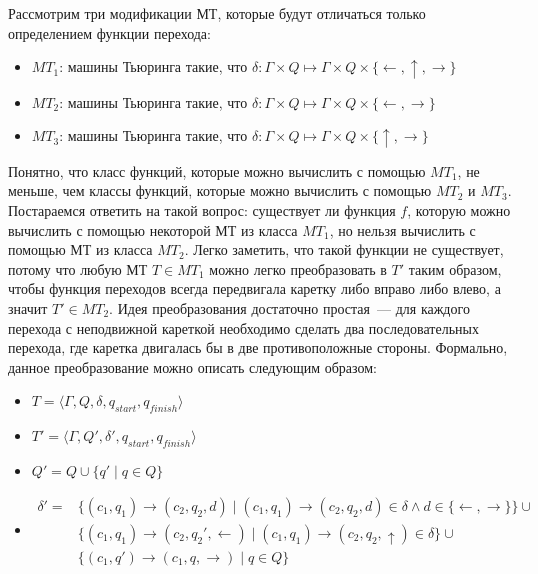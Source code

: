 \documentclass[
    11pt,
    a4paper
]{article}
\theoremstyle{definition}
\begin{document}
Рассмотрим три модификации МТ, которые будут отличаться только определением функции перехода:
\begin{itemize}
\item $MT_1$: машины Тьюринга такие, что $\delta: \Gamma \times Q \mapsto \Gamma \times Q \times \{\leftarrow, \uparrow, \rightarrow\}$
\item $MT_2$: машины Тьюринга такие, что $\delta: \Gamma \times Q \mapsto \Gamma \times Q \times \{\leftarrow, \rightarrow\}$
\item $MT_3$: машины Тьюринга такие, что $\delta: \Gamma \times Q \mapsto \Gamma \times Q \times \{\uparrow, \rightarrow\}$
\end{itemize}

Понятно, что класс функций, которые можно вычислить с помощью $MT_1$, не меньше, чем классы функций, которые можно вычислить с помощью $MT_2$ и $MT_3$. Постараемся ответить на такой вопрос: существует ли функция $f$, которую можно вычислить с помощью некоторой МТ из класса $MT_1$, но нельзя вычислить с помощью МТ из класса $MT_2$. Легко заметить, что такой функции не существует, потому что любую МТ $T \in MT_1$ можно легко преобразовать в $T'$ таким образом, чтобы функция переходов всегда передвигала каретку либо вправо либо влево, а значит $T' \in MT_2$. Идея преобразования достаточно простая~--- для каждого перехода с неподвижной кареткой необходимо сделать два последовательных перехода, где каретка двигалась бы в две противоположные стороны. Формально, данное преобразование можно описать следующим образом:
\begin{itemize}
\item $T = \langle \Gamma, Q, \delta, q_{start}, q_{finish} \rangle$
\item $T' = \langle \Gamma, Q', \delta', q_{start}, q_{finish} \rangle$
\item $Q' = Q \cup \{ q' \mid q \in Q \}$
\item \begin{align*}\delta' = &\{ (c_1, q_1) \rightarrow (c_2, q_2, d) \mid (c_1, q_1) \rightarrow (c_2, q_2, d) \in \delta \wedge d \in \{ \leftarrow, \rightarrow \} \} \cup\\
& \{ (c_1, q_1) \rightarrow (c_2, q_2', \leftarrow) \mid (c_1, q_1) \rightarrow (c_2, q_2, \uparrow) \in \delta \} \cup \\
& \{ (c_1, q') \rightarrow (c_1, q, \rightarrow) \mid q \in Q \}
\end{align*}
\end{itemize}
\end{document}
